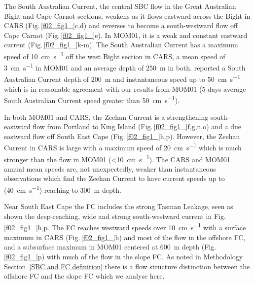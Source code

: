 \documentclass[preprint,3p,review,12pt]{elsarticle}
\begin{document}
The South Australian Current, the central SBC flow in the Great Australian Bight and Cape Carnot sections, weakens as it flows eastward across the Bight in CARS (Fig.\,\ref{f02_fig1_}c,d) and reverses to become a south-westward flow off Cape Carnot (Fig.\,\ref{f02_fig1_}e). In MOM01, it is a weak and constant eastward current (Fig.\,\ref{f02_fig1_}k-m). The South Australian Current has a maximum speed of \SI{10}{\centi\meter\per\second} off the west Bight section in CARS, a mean speed of \SI{3}{\centi\meter\per\second} in MOM01 and an average depth of \SI{250}{\meter} in both. \citet{Middleton2007} reported a South Australian Current depth of \SI{200}{\meter} and instantaneous speed up to \SI{50}{\centi\meter\per\second} which is in reasonable agreement with our results from MOM01 (5-days average South Australian Current speed greater than \SI{50}{\centi\meter\per\second}).

In both MOM01 and CARS, the Zeehan Current is a strengthening south-eastward flow from Portland to King Island (Fig.\,\ref{f02_fig1_}f,g,n,o) and a due eastward flow off South East Cape (Fig.\,\ref{f02_fig1_}h,p). However, the Zeehan Current in CARS is large with a maximum speed of \SI{20}{\centi\meter\per\second} which is much stronger than the flow in MOM01 (\SI{<10}{\centi\meter\per\second}). The CARS and MOM01 annual mean speeds are, not unexpectedly, weaker than instantaneous observations \citep{Ridgway2007} which find the Zeehan Current to have current speeds up to (\SI{40}{\centi\meter\per\second}) reaching to \SI{300}{\meter} depth.

Near South East Cape the FC includes the strong Tasman Leakage, seen as shown the deep-reaching, wide and strong south-westward current in Fig.\,\ref{f02_fig1_}h,p.
The FC reaches westward speeds over \SI{10}{\centi\meter\per\second} with a surface maximum in CARS (Fig.\,\ref{f02_fig1_}h) and most of the flow in the offshore FC, and a subsurface maximum in MOM01 centered at \SI{600}{\meter} depth (Fig.\,\ref{f02_fig1_}p) with much of the flow in the slope FC\@. As noted in Methodology Section~\ref{SBC and FC definition} there is a flow structure distinction between the offshore FC and the slope FC which we analyse here.
\end{document}
